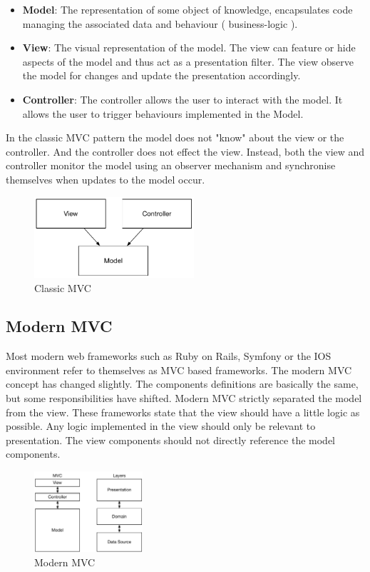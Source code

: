 \begin{itemize}[label={}]

\item \textbf{Model}: The representation of some object of knowledge, encapsulates code managing the associated data and behaviour ( business-logic ).
\item \textbf{View}: The visual representation of the model. The view can feature or hide aspects of the model and thus act as a presentation filter. The view observe the model for changes and update the presentation accordingly.
\item \textbf{Controller}: The controller allows the user to interact with the model. It allows the user to trigger behaviours implemented in the Model.

\end{itemize}

In the classic MVC pattern the model does not "know" about the view or the controller. And the controller does not effect the view. Instead, both the view and controller monitor the model using an observer mechanism and synchronise themselves when updates to the model occur.

\begin{figure}[H]
    \centering
    \includegraphics[height=3cm,keepaspectratio]{assets/concept/mvc_1.pdf}
    \caption{Classic MVC}
    \label{fig:mvc_1}
\end{figure}

\subsection{Modern MVC}

Most modern web frameworks such as Ruby on Rails, Symfony or the IOS environment refer to themselves as MVC based frameworks. The modern MVC concept has changed slightly. The components definitions are basically the same, but some responsibilities have shifted. Modern MVC strictly separated the model from the view. These frameworks state that the view should have a little logic as possible. Any logic implemented in the view should only be relevant to presentation. The view components should not directly reference the model components\cite{apple_MVC}\cite{symfony_MVC}.

\begin{figure}[H]
    \centering
    \includegraphics[height=3cm,keepaspectratio]{assets/concept/mvc_2.pdf}
    \caption{Modern MVC}
    \label{fig:mvc_2}
\end{figure}

